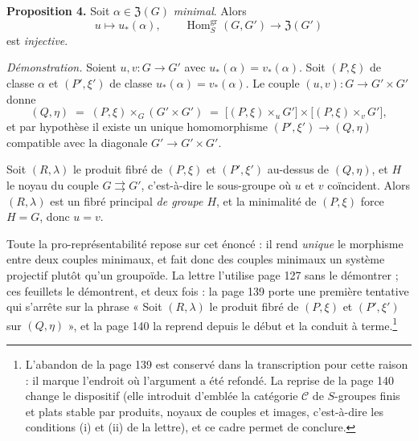 \documentclass[11pt,a4paper]{article}
\begin{document}
\textbf{Proposition 4.} Soit $\alpha \in \mathfrak{Z}(G)$ \emph{minimal}. Alors
\[
  u \longmapsto u_{*}(\alpha) , \qquad
  \operatorname{Hom}^{\mathrm{gr}}_{S}(G, G') \longrightarrow \mathfrak{Z}(G')
\]
est \emph{injective}.

\emph{Démonstration.} Soient $u, v : G \to G'$ avec $u_{*}(\alpha) =
v_{*}(\alpha)$. Soit $(P, \xi)$ de classe $\alpha$ et $(P', \xi')$ de classe
$u_{*}(\alpha) = v_{*}(\alpha)$. Le couple $(u,v) : G \to G' \times G'$ donne
\[
  (Q, \eta) \;=\; (P, \xi) \times_{G} (G' \times G')
  \;=\; \bigl[(P,\xi) \times_{u} G'\bigr] \times
        \bigl[(P,\xi) \times_{v} G'\bigr] ,
\]
et par hypothèse il existe un unique homomorphisme $(P', \xi') \to (Q, \eta)$
compatible avec la diagonale $G' \to G' \times G'$.

\qquad
{}

Soit $(R, \lambda)$ le produit fibré de $(P, \xi)$ et $(P', \xi')$ au-dessus de
$(Q, \eta)$, et $H$ le noyau du couple $G \rightrightarrows G'$,
c'est-à-dire le sous-groupe où $u$ et $v$ coïncident. Alors $(R, \lambda)$ est
un fibré principal \emph{de groupe $H$}, et la minimalité de $(P, \xi)$ force
$H = G$, donc $u = v$.

Toute la pro-représentabilité repose sur cet énoncé : il
rend \emph{unique} le morphisme entre deux couples minimaux, et fait donc des
couples minimaux un système projectif plutôt qu'un groupoïde. La lettre l'utilise
page 127 sans le démontrer ; ces feuillets le démontrent, et deux fois : la
page 139 porte une première tentative qui s'arrête sur la phrase « Soit
$(R,\lambda)$ le produit fibré de $(P,\xi)$ et $(P',\xi')$ sur $(Q,\eta)$ », et
la page 140 la reprend depuis le début et la conduit à
terme.\footnote{L'abandon de la page 139 est conservé dans la transcription
pour cette raison : il marque l'endroit où l'argument a été refondé. La reprise
de la page 140 change le dispositif (elle introduit d'emblée la catégorie
$\mathcal{C}$ de $S$-groupes finis et plats stable par produits, noyaux de
couples et images, c'est-à-dire les conditions (i) et (ii) de la lettre), et
ce cadre permet de conclure.}
\end{document}
